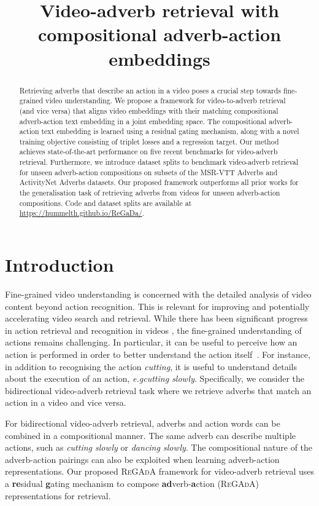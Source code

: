 \documentclass[table]{bmvc2k}
\title{Video-adverb retrieval with compositional adverb-action embeddings}
\def\eg{\emph{e.g}\bmvaOneDot}
\newcommand{\modelName}{\textsc{ReGAdA}\xspace}
\begin{document}
\maketitle

\begin{abstract}
Retrieving adverbs that describe an action in a video poses a crucial step towards fine-grained video understanding.
We propose a framework for video-to-adverb retrieval (and vice versa) that aligns video embeddings with their matching compositional adverb-action text embedding in a joint embedding space. The compositional adverb-action text embedding is learned using a residual gating mechanism, along with a novel training objective consisting of triplet losses and a regression target.
Our method achieves state-of-the-art performance on five recent benchmarks for video-adverb retrieval. Furthermore, we introduce dataset splits to benchmark video-adverb retrieval for unseen adverb-action compositions on subsets of the MSR-VTT Adverbs and ActivityNet Adverbs datasets. 
Our proposed framework outperforms all prior works for the generalisation task of retrieving adverbs from videos for unseen adverb-action compositions.
Code and dataset splits are available at \url{https://hummelth.github.io/ReGaDa/}.
\end{abstract}

\section{Introduction}


Fine-grained video understanding is concerned with the detailed analysis of video content beyond action recognition. This is relevant for improving and potentially accelerating video search and retrieval. While there has been significant progress in action retrieval and recognition in videos \cite{miech2020end,patrick2020support,tanberk2020hybrid, alhersh2021learning}, the fine-grained understanding of actions remains challenging. In particular,
it can be useful to perceive how an action is performed in order to better understand the action itself~\cite{doughty_action_2020,doughty_how_2022,moltisanti2023learning}. 
For instance, in addition to recognising the action \textit{cutting}, it is useful to understand details about the execution of an action, \eg \textit{cutting slowly}.
Specifically, we consider the bidirectional video-adverb retrieval task where we retrieve adverbs that match an action in a video and vice versa.

For bidirectional video-adverb retrieval, adverbs and action words can be combined in a compositional manner. The same adverb can describe multiple actions, such as \textit{cutting slowly} or \textit{dancing slowly}. 
The compositional nature of the adverb-action pairings can also be exploited when learning adverb-action representations.
Our proposed \modelName framework for video-adverb retrieval uses a \textbf{re}sidual \textbf{g}ating mechanism to compose \textbf{ad}verb-\textbf{a}ction (\modelName) representations for retrieval. 
\end{document}
